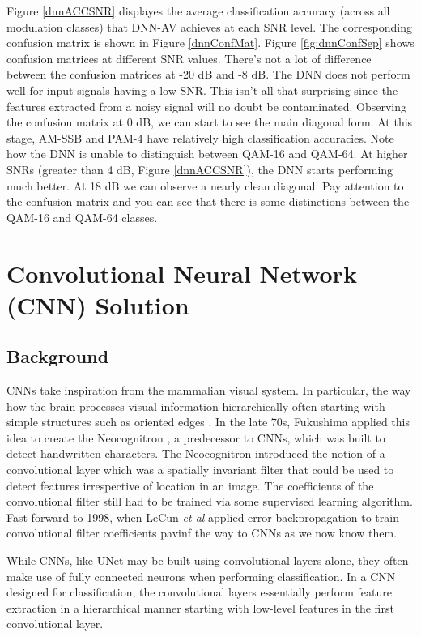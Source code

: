 \documentclass[journal,onecolumn]{IEEEtran}
\begin{document}
Figure \ref{dnnACCSNR} displayes the average classification accuracy (across all modulation classes) that DNN-AV achieves at each SNR level. The corresponding confusion matrix is shown in Figure \ref{dnnConfMat}. Figure \ref{fig:dnnConfSep} shows confusion matrices at different SNR values. There's not a lot of difference between the confusion matrices at -20 dB and -8 dB. The DNN does not perform well for input signals having a low SNR. This isn't all that surprising since the features extracted from a noisy signal will no doubt be contaminated. Observing the confusion matrix at 0 dB, we can start to see the main diagonal form. At this stage, AM-SSB and PAM-4 have relatively high classification accuracies. Note how the DNN is unable to distinguish between QAM-16 and QAM-64. At higher SNRs (greater than 4 dB, Figure \ref{dnnACCSNR}), the DNN starts performing much better. At 18 dB we can observe a nearly clean diagonal. Pay attention to the confusion matrix and you can see that there is some distinctions between the QAM-16 and QAM-64 classes.

\section{Convolutional Neural Network (CNN) Solution}

\subsection{Background}

CNNs take inspiration from the mammalian visual system. In particular, the way how the brain processes visual information hierarchically often starting with simple structures such as oriented edges \cite{catEye}. In the late 70s, Fukushima applied this idea to create the Neocognitron \cite{neocognitron}, a predecessor to CNNs, which was built to detect handwritten characters. The Neocognitron introduced the notion of a convolutional layer which was a spatially invariant filter that could be used to detect features irrespective of location in an image. The coefficients of the convolutional filter still had to be trained via some supervised learning algorithm. Fast forward to 1998, when LeCun \textit{et al} \cite{lenet5} applied error backpropagation to train convolutional filter coefficients pavinf the way to CNNs as we now know them.

While CNNs, like UNet \cite{unet} may be built using convolutional layers alone, they often make use of fully connected neurons when performing classification. In a CNN designed for classification, the convolutional layers essentially perform feature extraction in a hierarchical manner starting with low-level features in the first convolutional layer.
\end{document}
